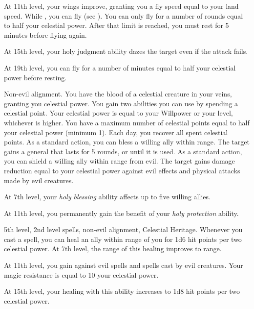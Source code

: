     At 11th level, your wings improve, granting you a fly speed equal to your land speed.
    While , you can fly (see ).
    You can only fly for a number of rounds equal to half your celestial power.
    After that limit is reached, you must rest for 5 minutes before flying again.

    At 15th level, your holy judgment ability dazes the target even if the attack fails.

    At 19th level, you can fly for a number of minutes equal to half your celestial power before resting.

    \featpres Non-evil alignment.
    \featben You have the blood of a celestial creature in your veins, granting you celestial power.
    You gain two abilities you can use by spending a celestial point.
    Your celestial power is equal to your Willpower or your level, whichever is higher.
    You have a maximum number of celestial points equal to half your celestial power (minimum 1).
    Each day, you recover all spent celestial points.
     As a standard action, you can bless a willing ally within \rngmed range. The target gains a general  that lasts for 5 rounds, or until it is used.
     As a standard action, you can shield a willing ally within \rngclose range from evil. The target gains damage reduction equal to your celestial power against evil effects and physical attacks made by evil creatures.

    At 7th level, your \textit{holy blessing} ability affects up to five willing allies.

    At 11th level, you permanently gain the benefit of your \textit{holy protection} ability.

    \featpres 5th level, 2nd level spells, non-evil alignment, Celestial Heritage.
    \featben Whenever you cast a spell, you can heal an ally within \rngclose range of you for 1d6 hit points per two celestial power.
    At 7th level, the range of this healing improves to \rngmed range.

    At 11th level, you gain  against evil spells and spells cast by evil creatures.
    Your magic resistance is equal to 10 \add your celestial power.

    At 15th level, your healing with this ability increases to 1d8 hit points per two celestial power.

